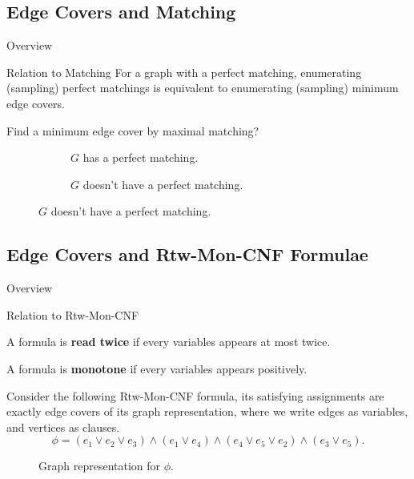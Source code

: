 \documentclass[mathserif]{beamer}
\begin{document}
\subsection{Edge Covers and Matching}
\begin{frame}{Overview}
	\tableofcontents[currentsubsection, hideothersubsections, sectionstyle=show/shaded, subsectionstyle=show/shaded]
\end{frame}
\begin{frame}{Relation to Matching}
For a graph with a perfect matching, enumerating (sampling) perfect matchings is equivalent to enumerating (sampling) minimum edge covers.
	\begin{example}
		Find a minimum edge cover by maximal matching?
		\begin{figure}[htp]
			\begin{subfigure}[b]{0.49\textwidth}
				\centering
				
				\caption{$G$ has a perfect matching.}
			\end{subfigure}
			\hfill
			\begin{subfigure}[b]{0.49\textwidth}
				\centering
				

				\caption{$G$ doesn't have a perfect matching.}
			\end{subfigure}
		\end{figure}
	\end{example}
\end{frame}

\subsection{Edge Covers and Rtw-Mon-CNF Formulae}
\begin{frame}{Overview}
	\tableofcontents[currentsubsection, hideothersubsections, sectionstyle=show/shaded, subsectionstyle=show/shaded]
\end{frame}

\begin{frame}{Relation to Rtw-Mon-CNF}
    \begin{definition}
        A formula is {\bf read twice} if every variables appears at most twice.
        
        A formula is {\bf monotone} if every variables appears positively.
    \end{definition}
    \pause
	Consider the following Rtw-Mon-CNF formula, its satisfying assignments are exactly edge covers of its graph representation, where we write edges as variables, and vertices as clauses.
	\[
		\phi = (e_1 \vee e_2 \vee e_3) \wedge (e_1 \vee e_4) \wedge (e_4 \vee e_5 \vee e_2 ) \wedge (e_3 \vee e_5).
	\]

	\begin{figure}[htp]
		\centering
		
		\caption{Graph representation for $\phi$.}
	\end{figure}
\end{frame}
\end{document}
